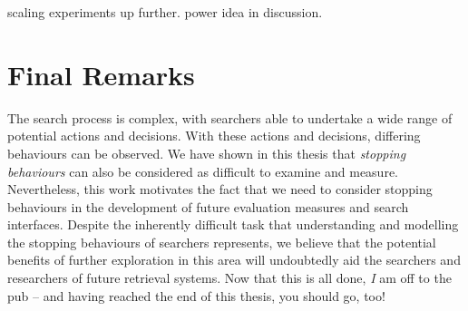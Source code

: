 scaling experiments up further.
    power idea in discussion.


\section{Final Remarks}\label{sec:conclusions:remarks}
The search process is complex, with searchers able to undertake a wide range of potential actions and decisions. With these actions and decisions, differing behaviours can be observed. We have shown in this thesis that \emph{stopping behaviours} can also be considered as difficult to examine and measure. Nevertheless, this work motivates the fact that we need to consider stopping behaviours in the development of future evaluation measures and search interfaces. Despite the inherently difficult task that understanding and modelling the stopping behaviours of searchers represents, we believe that the potential benefits of further exploration in this area will undoubtedly aid the searchers and researchers of future retrieval systems. Now that this is all done, \emph{I} am off to the pub -- and having reached the end of this thesis, you should go, too!